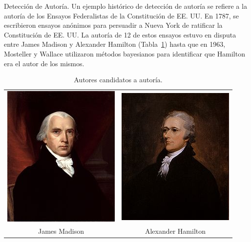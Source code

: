 \documentclass[11pt,fleqn]{book} %
\begin{document}
\begin{example}
Detección de Autoría. Un ejemplo histórico de detección de autoría se refiere a la autoría de los Ensayos Federalistas de la Constitución de EE. UU. En 1787, se escribieron ensayos anónimos para persuadir a Nueva York de ratificar la Constitución de EE. UU. La autoría de 12 de estos ensayos estuvo en disputa entre James Madison y Alexander Hamilton (Tabla~\ref{fig:autores}) hasta que en 1963, Mosteller y Wallace \cite{mosteller1963inference} utilizaron métodos bayesianos para identificar que Hamilton era el autor de los mismos.


\begin{table}[h]
    \centering
    \begin{tabular}{cc}
        \includegraphics[height=0.3\textwidth]{pics/madison.png} & \includegraphics[height=0.3\textwidth]{pics/hamilton.png} \\
        James Madison & Alexander Hamilton \\
    \end{tabular}
    \caption{Autores candidatos a autoría.}
    \label{fig:autores}
\end{table}



\end{example}
\end{document}
